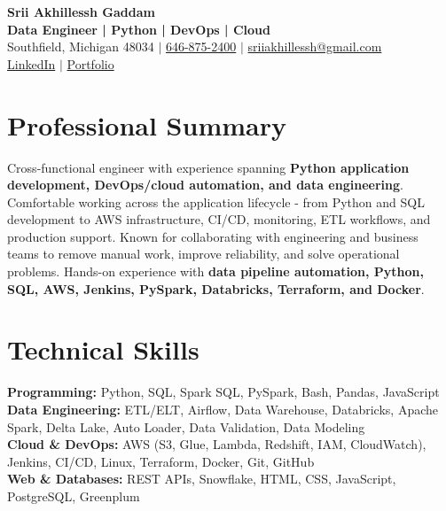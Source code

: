 \documentclass[letterpaper,10pt]{article}
\begin{document}
\fontsize{9.35pt}{10.45pt}\selectfont

\begin{center}
    {\LARGE \textbf{Srii Akhillessh Gaddam}} \\[-1pt]
    \textbf{Data Engineer | Python | DevOps | Cloud} \\[2pt]
    Southfield, Michigan 48034 $|$
    \href{tel:6468752400}{646-875-2400} $|$
    \href{mailto:sriiakhillessh@gmail.com}{sriiakhillessh@gmail.com} \\[1pt]
    \href{https://www.linkedin.com/in/srii-akhiilessh-gaddam-b48668191/}{LinkedIn} $|$
    \href{https://sriiakhillesshg.github.io/portfolio/}{Portfolio}
\end{center}
\vspace{-8pt}

\section{Professional Summary}
\small{Cross-functional engineer with experience spanning \textbf{Python application development, DevOps/cloud automation, and data engineering}. Comfortable working across the application lifecycle - from Python and SQL development to AWS infrastructure, CI/CD, monitoring, ETL workflows, and production support. Known for collaborating with engineering and business teams to remove manual work, improve reliability, and solve operational problems. Hands-on experience with \textbf{data pipeline automation, Python, SQL, AWS, Jenkins, PySpark, Databricks, Terraform, and Docker}.}

\section{Technical Skills}
\small{
\textbf{Programming:} Python, SQL, Spark SQL, PySpark, Bash, Pandas, JavaScript \\
\textbf{Data Engineering:} ETL/ELT, Airflow, Data Warehouse, Databricks, Apache Spark, Delta Lake, Auto Loader, Data Validation, Data Modeling \\
\textbf{Cloud \& DevOps:} AWS (S3, Glue, Lambda, Redshift, IAM, CloudWatch), Jenkins, CI/CD, Linux, Terraform, Docker, Git, GitHub \\
\textbf{Web \& Databases:} REST APIs, Snowflake, HTML, CSS, JavaScript, PostgreSQL, Greenplum
}
\end{document}
